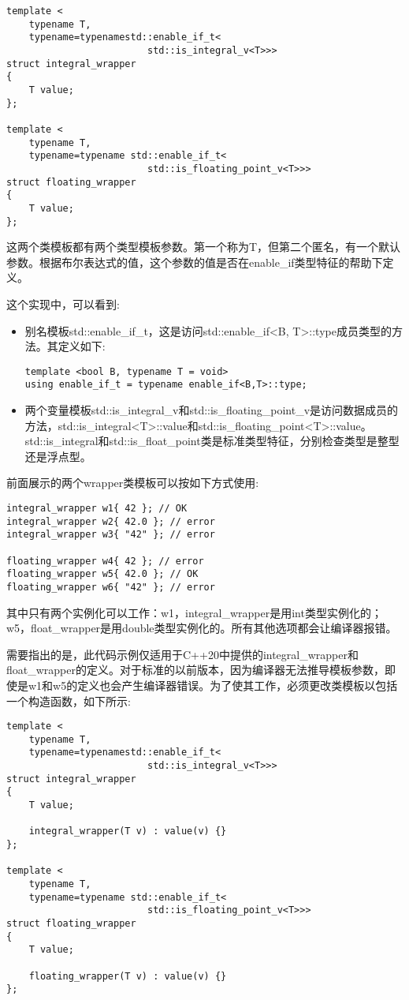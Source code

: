 \begin{lstlisting}[style=styleCXX]
template <
	typename T,
	typename=typenamestd::enable_if_t<
						 std::is_integral_v<T>>>
struct integral_wrapper
{
	T value;
};

template <
	typename T,
	typename=typename std::enable_if_t<
						 std::is_floating_point_v<T>>>
struct floating_wrapper
{
	T value;
};
\end{lstlisting}

这两个类模板都有两个类型模板参数。第一个称为T，但第二个匿名，有一个默认参数。根据布尔表达式的值，这个参数的值是否在enable\_if类型特征的帮助下定义。

这个实现中，可以看到:

\begin{itemize}
\item
别名模板std::enable\_if\_t，这是访问std::enable\_if<B, T>::type成员类型的方法。其定义如下:

\begin{lstlisting}[style=styleCXX]
template <bool B, typename T = void>
using enable_if_t = typename enable_if<B,T>::type;
\end{lstlisting}

\item
两个变量模板std::is\_integral\_v和std::is\_floating\_point\_v是访问数据成员的方法，std::is\_integral<T>::value和std::is\_floating\_point<T>::value。std::is\_integral和std::is\_float\_point类是标准类型特征，分别检查类型是整型还是浮点型。
\end{itemize}

前面展示的两个wrapper类模板可以按如下方式使用:

\begin{lstlisting}[style=styleCXX]
integral_wrapper w1{ 42 }; // OK
integral_wrapper w2{ 42.0 }; // error
integral_wrapper w3{ "42" }; // error

floating_wrapper w4{ 42 }; // error
floating_wrapper w5{ 42.0 }; // OK
floating_wrapper w6{ "42" }; // error
\end{lstlisting}

其中只有两个实例化可以工作：w1，integral\_wrapper是用int类型实例化的；w5，float\_wrapper是用double类型实例化的。所有其他选项都会让编译器报错。

需要指出的是，此代码示例仅适用于C++20中提供的integral\_wrapper和float\_wrapper的定义。对于标准的以前版本，因为编译器无法推导模板参数，即使是w1和w5的定义也会产生编译器错误。为了使其工作，必须更改类模板以包括一个构造函数，如下所示:

\begin{lstlisting}[style=styleCXX]
template <
	typename T,
	typename=typenamestd::enable_if_t<
						 std::is_integral_v<T>>>
struct integral_wrapper
{
	T value;
	
	integral_wrapper(T v) : value(v) {}
};

template <
	typename T,
	typename=typename std::enable_if_t<
						 std::is_floating_point_v<T>>>
struct floating_wrapper
{
	T value;
	
	floating_wrapper(T v) : value(v) {}
};
\end{lstlisting}

